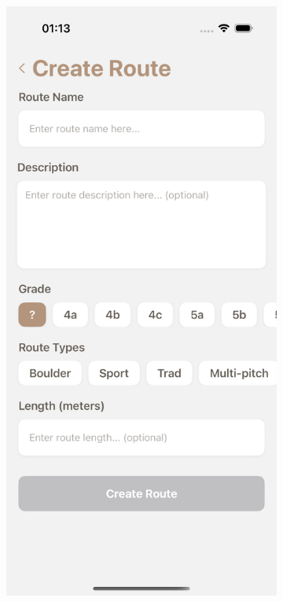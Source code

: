 \begin{figure}[H]
    \centering
    \begin{subfigure}[b]{0.38\textwidth}
        \centering
        \includegraphics[width=\textwidth]{images/implementacija/editing-options/create-route.png}

\end{subfigure}
\end{figure}
